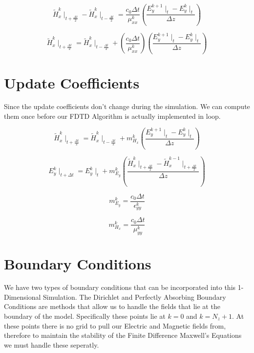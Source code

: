 \documentclass[a4paper,10pt]{article}
\begin{document}
\begin{equation*}
  \tilde{H}_{x}^{k}\mid_{t+\frac{\Delta t}{2}} - \tilde{H}_{x}^{k}\mid_{t-\frac{\Delta t}{2}} = \frac{c_0\Delta t}{\mu_{xx}^{k}}\left(\frac{E_{y}^{k+1}\mid_{t} - E_{y}^{k}\mid_{t}}{\Delta z}\right)
\end{equation*}

\begin{equation}
  \tilde{H}_{x}^{k}\mid_{t+\frac{\Delta t}{2}} = \tilde{H}_{x}^{k}\mid_{t-\frac{\Delta t}{2}} + \left(\frac{c_0\Delta t}{\mu_{xx}^{k}}\right)\left(\frac{E_{y}^{k+1}\mid_{t} - E_{y}^{k}\mid_{t}}{\Delta z}\right)
\end{equation}

\section{Update Coefficients}

Since the update coefficients don't change during the simulation.  We can compute them once before our FDTD Algorithm is actually implemented in loop.

\begin{equation}
  \tilde{H}_{x}^{k}\mid_{t+\frac{\Delta t}{2}} = \tilde{H}_{x}^{k}\mid_{t-\frac{\Delta t}{2}} + m_{H_x}^{k}\left(\frac{E_{y}^{k+1}\mid_{t} - E_{y}^{k}\mid_{t}}{\Delta z}\right)
\end{equation}

\begin{equation}
  E_{y}^{k}\mid_{t+\Delta t} = E_{y}^{k}\mid_{t} + m_{E_y}^{k}\left(\frac{\tilde{H}_{x}^{k}\mid_{t+\frac{\Delta t}{2}} - \tilde{H}_{x}^{k-1}\mid_{t+\frac  {\Delta t}{2}}}{\Delta z}\right)
\end{equation}


\begin{equation}
  m_{E_y}^{k} = \frac{c_0 \Delta t}{\epsilon_{yy}^{k}}
\end{equation}

\begin{equation}
   m_{H_x}^{k} = \frac{c_0 \Delta t}{\mu_{yy}^{k}}
\end{equation}



\section{Boundary Conditions}
We have two types of boundary conditions that can be incorporated into this 1-Dimensional Simulation.  The Dirichlet and Perfectly Absorbing Boundary Conditions are methods that allow us to handle the fields that lie at the boundary of the model.  Specifically these points lie at $k = 0$ and $k = N_z+1$.  At these points there is no grid to pull our Electric and Magnetic fields from, therefore to maintain the stability of the Finite Difference Maxwell's Equations we must handle these seperatly.
\end{document}
